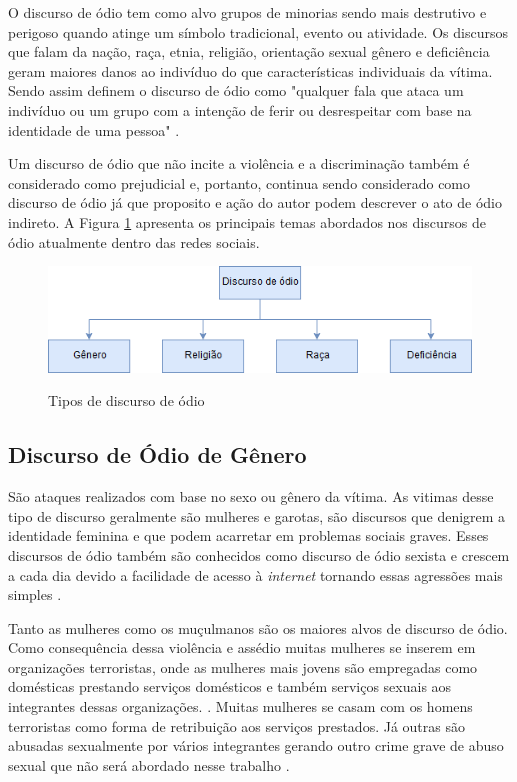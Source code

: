 O discurso de ódio tem como alvo grupos de minorias sendo mais destrutivo e perigoso quando atinge um símbolo tradicional, evento ou atividade. Os discursos que falam da nação, raça, etnia, religião, orientação sexual gênero e deficiência geram maiores danos ao indivíduo do que características individuais da vítima. Sendo assim  definem o discurso de ódio como "qualquer fala que ataca um indivíduo ou um grupo com a intenção de ferir ou desrespeitar com base na identidade de uma pessoa" \cite{Chetty2018}.

Um discurso de ódio que não incite a violência e a discriminação também é considerado como prejudicial e, portanto, continua sendo considerado como discurso de ódio já que proposito e ação do autor podem descrever o ato de ódio indireto. A Figura \ref{fig:tiposdediscursodeodio} apresenta os principais temas abordados nos discursos de ódio atualmente dentro das redes sociais.

\begin{figure}[!h]
\centering 
\caption{Tipos de discurso de ódio}
\includegraphics[scale=0.70]{imagens/tiposdediscursodeodio.png}
\label{fig:tiposdediscursodeodio}
\end{figure}

\subsection{Discurso de Ódio de Gênero}
São ataques realizados com base no sexo ou gênero da vítima. As vitimas desse tipo de discurso geralmente são mulheres e garotas, são discursos que denigrem a identidade feminina e que podem acarretar em problemas sociais graves. Esses discursos de ódio também são conhecidos como discurso de ódio sexista e crescem a cada dia devido a facilidade de acesso à \textit{internet} tornando essas agressões mais simples \cite{Chetty2018}.

Tanto as mulheres como os muçulmanos são os maiores alvos de discurso de ódio. Como consequência dessa violência e assédio muitas mulheres se inserem em organizações terroristas, onde as mulheres mais jovens são empregadas como domésticas prestando serviços domésticos e também serviços sexuais aos integrantes dessas organizações. \cite{Edwards2016}. Muitas mulheres se casam com os homens terroristas como forma de retribuição aos serviços prestados. Já outras são abusadas sexualmente por vários integrantes gerando outro crime grave de abuso sexual que não será abordado nesse trabalho \cite{Edwards2016}.


